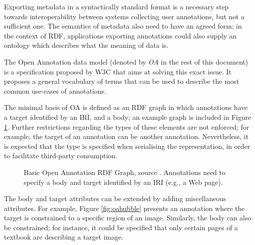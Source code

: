 
Exporting metadata in a syntactically standard format is a necessary step
towards interoperability between systems collecting user annotations, but not a
sufficient one. The semantics of metadata also need to have an agreed form;
in the context of RDF, applications exporting annotations could also supply an
ontology which describes what the meaning of data is.

The Open Annotation \cite{ref:oa} data model (denoted by \textit{OA} in the
rest of this document) is a specification proposed by W3C that aims at solving
this exact issue. It proposes a general vocabulary of terms that can be used to
describe the most common use-cases of annotations.

The minimal basis of OA is defined as an RDF graph in which annotations have a
target identified by an IRI, and a body; an example graph is included in
Figure \ref{fig:oa}. Further restrictions regarding the types of these elements
are not enforced; for example, the target of an annotation can be another
annotation. Nevertheless, it is expected that the type is specified when
serialising the representation, in order to facilitate third-party consumption.

\begin{figure}[!ht]
  \centering
  \caption[Basic Open Annotation RDF Graph]
          {Basic Open Annotation RDF Graph, source \cite{ref:oa}. Annotations
           need to specify a body and target identified by an IRI (e.g., a
           Web page).}
  \label{fig:oa}
\end{figure}

\newpage

The body and target attributes can be extended by adding miscellaneous attributes.
For example, Figure \ref{fig:oahubble} presents an annotation where the target
is constrained to a specific region of an image. Similarly, the body can also
be constrained; for instance, it could be specified that only certain pages of
a textbook are describing a target image.

